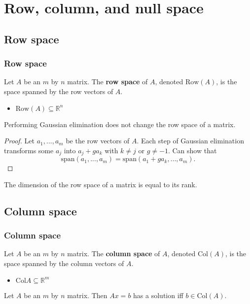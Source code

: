 \documentclass[compress]{beamer}
\def\R{\mathbb{R}}
\newcommand{\spn}{\mathrm{span}}
\newcommand{\row}{\mathrm{Row}}
\newcommand{\col}{\mathrm{Col}}
\begin{document}
\section{Row, column, and null space}

\subsection{Row space}
\begin{frame}[shrink]
  \frametitle{Row space}
  \begin{definition}
    Let $A$ be an $m$ by $n$ matrix. The \textbf{row space} of $A$,
    denoted $\row (A)$, is the space spanned by the row vectors of $A$.
  \end{definition}
  \begin{itemize}
  \item $\row(A) \subseteq \R^n$
  \end{itemize}
  \begin{lemma}
    Performing Gaussian elimination does not change the row space of a
    matrix. 
  \end{lemma}
  \begin{proof}
    Let $a_{1},...,a_m$ be the row vectors of $A$. Each step of Gaussian
    elimination transforms some $a_j$ into $a_j + g a_k$ with $k \neq j$
    or $g \neq -1$. Can show that
    \[ \spn(a_1,...,a_m) = \spn(a_1 + g a_k , ..., a_m). \]
  \end{proof}
  \begin{corollary}\label{cor:rankdimrow}
    The dimension of the row space of a matrix is equal to its rank.
  \end{corollary}
\end{frame}

\subsection{Column space}

\begin{frame}
  \frametitle{Column space}
  \begin{definition}
    Let $A$ be an $m$ by $n$ matrix. The \textbf{column space} of $A$,
    denoted $\col(A)$, is the space spanned by the column vectors of
    $A$.
  \end{definition}
  \begin{itemize}
  \item $\col{A} \subseteq \R^m$
  \end{itemize}
  \begin{lemma}
    Let $A$ be an $m$ by $n$ matrix. Then $A x = b$ has a solution iff $b
    \in \col(A)$.
  \end{lemma}
\end{frame}
\end{document}
